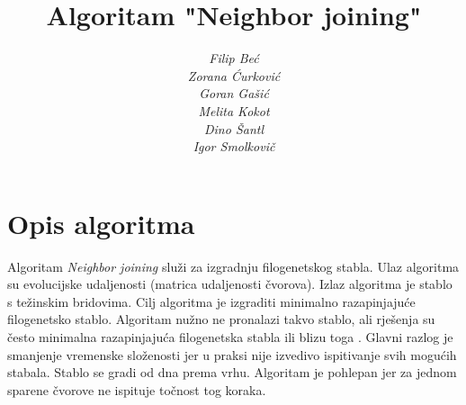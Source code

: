 \documentclass[times, utf8, seminar, numeric]{fer}
\begin{document}
\nocite{saitou}\nocite{phylpro}\nocite{wiki}\nocite{mbt}

\title{Algoritam "Neighbor joining"}

\author{\itshape{Filip Beć}\\
				 \itshape{Zorana Ćurković}\\
				 \itshape{Goran Gašić}\\
				 \itshape{Melita Kokot}\\
				 \itshape{Dino Šantl}\\
				 \itshape{Igor Smolkovič}
				 }


\maketitle

\tableofcontents

\chapter{Opis algoritma}

Algoritam \emph{Neighbor joining} služi za izgradnju filogenetskog stabla. Ulaz algoritma su evolucijske udaljenosti (matrica udaljenosti čvorova). Izlaz algoritma je stablo s težinskim bridovima. Cilj algoritma je izgraditi minimalno razapinjajuće filogenetsko stablo. Algoritam nužno ne pronalazi takvo stablo, ali rješenja su često minimalna razapinjajuća filogenetska stabla ili blizu toga \cite{saitou}. Glavni razlog je smanjenje vremenske složenosti jer u praksi nije izvedivo ispitivanje svih mogućih stabala. Stablo se gradi od dna prema vrhu. Algoritam je pohlepan jer za jednom sparene čvorove ne ispituje točnost tog koraka.
\end{document}
